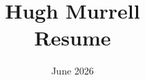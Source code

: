 \documentclass[12pt]{article}
\title{
           Hugh Murrell \\
           Resume \\
       }
\date{June 2026}
\begin{document}
\maketitle


%

\small
\end{document}
